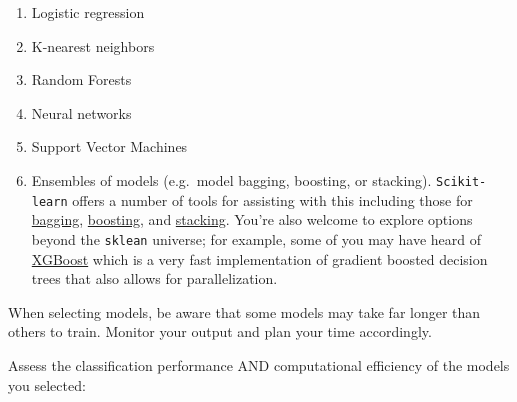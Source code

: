 \documentclass[
  letterpaper,
  DIV=11,
  numbers=noendperiod]{scrartcl}
\providecommand{\tightlist}{%
  \setlength{\itemsep}{0pt}\setlength{\parskip}{0pt}}\usepackage{longtable,booktabs,array}
\begin{document}
\begin{enumerate}
\def\labelenumi{\arabic{enumi}.}
\tightlist
\item
  Logistic regression
\item
  K-nearest neighbors
\item
  Random Forests
\item
  Neural networks
\item
  Support Vector Machines
\item
  Ensembles of models (e.g.~model bagging, boosting, or stacking).
  \texttt{Scikit-learn} offers a number of tools for assisting with this
  including those for
  \href{https://scikit-learn.org/stable/modules/generated/sklearn.ensemble.BaggingClassifier.html\#sklearn.ensemble.BaggingClassifier}{bagging},
  \href{https://scikit-learn.org/stable/modules/generated/sklearn.ensemble.GradientBoostingClassifier.html}{boosting},
  and
  \href{https://scikit-learn.org/stable/modules/generated/sklearn.ensemble.StackingClassifier.html}{stacking}.
  You're also welcome to explore options beyond the \texttt{sklean}
  universe; for example, some of you may have heard of
  \href{https://github.com/dmlc/xgboost}{XGBoost} which is a very fast
  implementation of gradient boosted decision trees that also allows for
  parallelization.
\end{enumerate}

When selecting models, be aware that some models may take far longer
than others to train. Monitor your output and plan your time
accordingly.

Assess the classification performance AND computational efficiency of
the models you selected:
\end{document}
